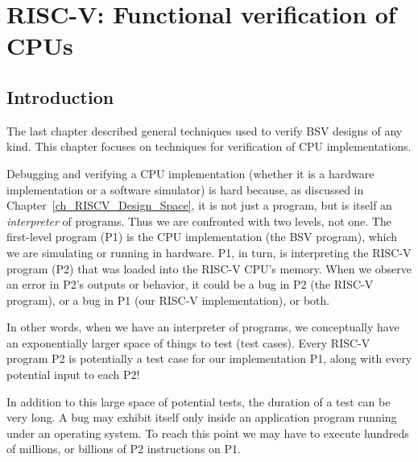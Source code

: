

\chapter{RISC-V: Functional verification of CPUs}


\setcounter{page}{1}
\renewcommand{\thepage}{\arabic{chapter}-\arabic{page}}

\label{ch_RISCV_verification}


\section{Introduction}

\label{Sec_RISCV_verification_intro}

The last chapter described general techniques used to verify BSV
designs of any kind.  This chapter focuses on techniques for
verification of CPU implementations.

Debugging and verifying a CPU implementation (whether it is a hardware
implementation or a software simulator) is hard because, as discussed
in Chapter~\ref{ch_RISCV_Design_Space}, it is not just a program, but
is itself an \emph{interpreter} of programs.  Thus we are confronted
with two levels, not one.  The first-level program (P1) is the CPU
implementation (the BSV program), which we are simulating or running
in hardware.  P1, in turn, is interpreting the RISC-V program (P2)
that was loaded into the RISC-V CPU's memory. When we observe an error
in P2's outputs or behavior, it could be a bug in P2 (the RISC-V
program), or a bug in P1 (our RISC-V implementation), or both.

In other words, when we have an interpreter of programs, we
conceptually have an exponentially larger space of things to test
(test cases).  Every RISC-V program P2 is potentially a test case for
our implementation P1, along with every potential input to each P2!

In addition to this large space of potential tests, the duration of a
test can be very long.  A bug may exhibit itself only inside an
application program running under an operating system.  To reach this
point we may have to execute hundreds of millions, or billions of P2
instructions on P1.

